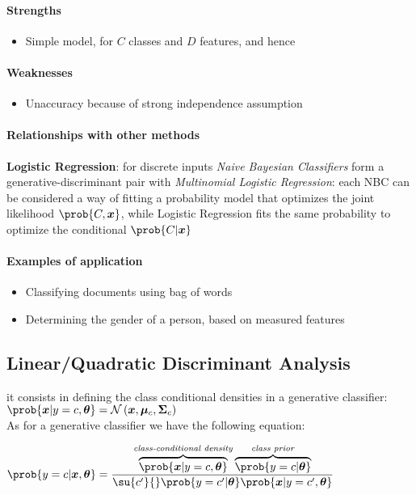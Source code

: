 \paragraph{Strengths}
\begin{itemize}
    \item Simple model, for $C$ classes and $D$ features, and hence 
\end{itemize}

\paragraph{Weaknesses}
\begin{itemize}
    \item Unaccuracy because of strong independence assumption
\end{itemize}

\paragraph{Relationships with other methods}
\textbf{Logistic Regression}: for discrete inputs 
\emph{Naive Bayesian Classifiers} form a 
generative-discriminant pair with \emph{Multinomial Logistic
Regression}: each NBC can be considered a way of fitting a
probability model that optimizes the joint likelihood 
$\prob{C, \bm{x}}$, while Logistic Regression fits the same 
probability to optimize the conditional $\prob{C|\bm{x}}$

\paragraph{Examples of application}
\begin{itemize}
    \item Classifying documents using bag of words
    \item Determining the gender of a person, based on measured features 
\end{itemize}


\subsection{Linear/Quadratic Discriminant Analysis}
it consists in defining the class conditional densities in a generative
classifier: $\prob{\bm{x}|y=c,\bm{\theta}} = \mathcal{N}\left(\bm{x},
\bm{\mu}_{c},\bm{\Sigma}_{c}\right)$\\
As for a generative classifier we have the following equation: 
\begin{center}
    $\prob{y=c|\bm{x},\bm{\theta}} = \dfrac{\overbrace{\prob{\bm{x}|y=c,
        \bm{\theta}}}^{\text{\emph{class-conditional density}}}
        \overbrace{\prob{y=c|\bm{\theta}}}^{\text{\emph{class prior}}}}{
    \su{c'}{}\prob{y=c'|\bm{\theta}} \prob{\bm{x}|y=c',\bm{\theta}}}$
\end{center}
